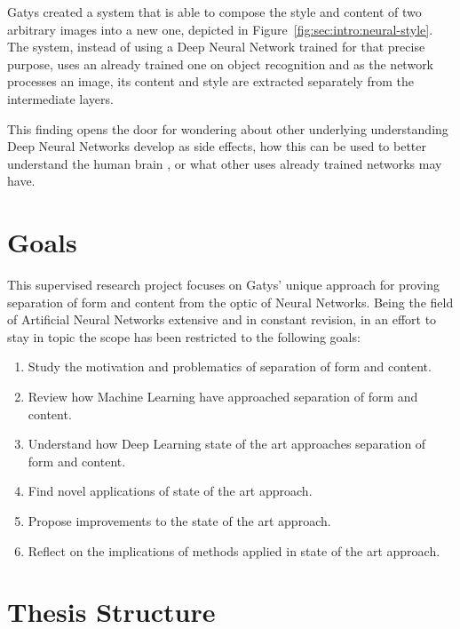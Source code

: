 Gatys created a system that is able to compose the style and content of two arbitrary images into a new one, depicted in Figure~\ref{fig:sec:intro:neural-style}.
The system, instead of using a Deep Neural Network trained for that precise purpose, uses an already trained one on object recognition and as the network processes an image, its content and style are extracted separately from the intermediate layers.

This finding opens the door for wondering about other underlying understanding Deep Neural Networks develop as side effects, how this can be used to better understand the human brain \cite{Yamins2016}, or what other uses already trained networks may have.



\section{Goals}
\label{sec:intro:goals}

This supervised research project focuses on Gatys' unique approach for proving separation of form and content from the optic of Neural Networks. Being the field of Artificial Neural Networks extensive and in constant revision, in an effort to stay in topic the scope has been restricted to the following goals:

\begin{enumerate}
  \item Study the motivation and problematics of separation of form and content.
  \item Review how Machine Learning have approached separation of form and content.
  \item Understand how Deep Learning state of the art approaches separation of form and content.
  \item Find novel applications of state of the art approach.
  \item Propose improvements to the state of the art approach.
  \item Reflect on the implications of methods applied in state of the art approach.
\end{enumerate}



\section{Thesis Structure}
\label{sec:intro:structure}

